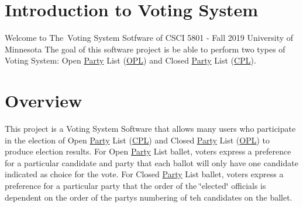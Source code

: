\hypertarget{index_intro_sec}{}\section{Introduction to Voting System}\label{index_intro_sec}
Welcome to The \+Voting System Sotfware of C\+S\+CI 5801 -\/ Fall 2019 University of Minnesota The goal of this software project is be able to perform two types of Voting System\+: Open \hyperlink{classParty}{Party} List (\hyperlink{classOPL}{O\+PL}) and Closed \hyperlink{classParty}{Party} List (\hyperlink{classCPL}{C\+PL}).\hypertarget{index_overview}{}\section{Overview}\label{index_overview}
This project is a Voting System Software that allows many users who participate in the election of Open \hyperlink{classParty}{Party} List (\hyperlink{classCPL}{C\+PL}) and Closed \hyperlink{classParty}{Party} List (\hyperlink{classOPL}{O\+PL}) to produce election results. For Open \hyperlink{classParty}{Party} List ballet, voters express a preference for a particular candidate and party that each ballot will only have one candidate indicated as choice for the vote. For Closed \hyperlink{classParty}{Party} List ballet, voters express a preference for a particular party that the order of the \char`\"{}elected\char`\"{} officials is dependent on the order of the party\textquotesingle{}s numbering of teh candidates on the ballet.

